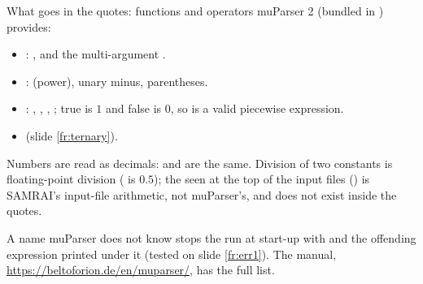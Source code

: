 \documentclass[aspectratio=169,11pt]{beamer}
\begin{document}
\begin{frame}{What goes in the quotes: functions and operators}
\label{fr:funcs}
\small muParser 2 (bundled in ) provides:
\begin{itemize}
  \item {}: , and the multi-argument .
  \item {}: \code{+ - * / \^{}} (power), unary minus, parentheses.
  \item {}: \code{< <= > >= == !=}, \code{\&\&}, \code{||}, \code{!}; true is $1$ and false is $0$, so  is a valid piecewise expression.
  \item {}  (slide \ref{fr:ternary}).
\end{itemize}
\vspace{1mm}
\begin{punchbox}
\small Numbers are read as decimals:  and  are the same. Division of two constants is floating-point division ( is $0.5$); the  seen at the top of the input files () is SAMRAI's input-file arithmetic, not muParser's, and does not exist inside the quotes.
\end{punchbox}
\vspace{1mm}
\small A name muParser does not know stops the run at start-up with  and the offending expression printed under it (tested on slide \ref{fr:err1}). The manual, \url{https://beltoforion.de/en/muparser/}, has the full list.
\end{frame}
\end{document}
